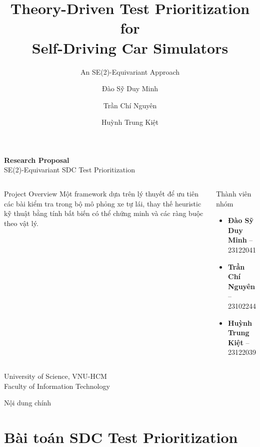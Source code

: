 \documentclass[aspectratio=169,10pt]{beamer}
\title{Theory-Driven Test Prioritization for\\Self-Driving Car Simulators}
\subtitle{An SE(2)-Equivariant Approach}
\author{Đào Sỹ Duy Minh \and Trần Chí Nguyên \and Huỳnh Trung Kiệt}
\institute{University of Science, VNU-HCM \\[3pt]
           \footnotesize \textit{Research Proposal -- Targeting NeurIPS 2026}}
\date{}
\begin{document}
\maketitle

\begin{frame}
\centering
\LARGE \textbf{Research Proposal}\\[0.5em]
\large \textcolor{navydeep}{SE(2)-Equivariant SDC Test Prioritization}

\vspace{2em}

\begin{columns}[c]
\begin{block}{Project Overview}
\footnotesize
Một framework dựa trên lý thuyết để ưu tiên các bài kiểm tra trong bộ mô phỏng xe tự lái, thay thế heuristic kỹ thuật bằng tính bất biến có thể chứng minh và các ràng buộc theo vật lý.
\end{block}

\begin{block}{Thành viên nhóm}
\footnotesize
\begin{itemize}
  \item \textbf{Đào Sỹ Duy Minh} -- 23122041
  \item \textbf{Trần Chí Nguyên} -- 23102244
  \item \textbf{Huỳnh Trung Kiệt} -- 23122039
\end{itemize}
\end{block}
\end{columns}

\vspace{1.5em}
\scriptsize
University of Science, VNU-HCM\\
Faculty of Information Technology
\end{frame}

\begin{frame}{Nội dung chính}
\tableofcontents[hideallsubsections]
\end{frame}

\section{Bài toán SDC Test Prioritization}
\end{document}
